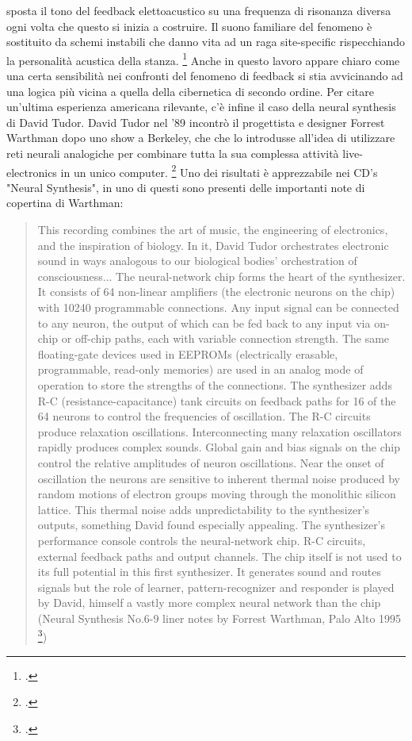 sposta il tono del feedback elettoacustico su una frequenza di risonanza
diversa ogni volta che questo si inizia a
costruire. Il suono familiare del fenomeno è sostituito da schemi instabili
che danno vita ad un raga site-specific
rispecchiando la personalità acustica della stanza. \footcite{collinspeasouphist}
Anche in questo lavoro appare chiaro come una certa sensibilità
nei confronti del fenomeno di feedback si stia avvicinando ad una logica più vicina
a quella della cibernetica di secondo ordine.
Per citare un'ultima esperienza americana rilevante,
c'è infine il caso della neural synthesis di David Tudor.
David Tudor nel '89 incontrò il progettista e designer Forrest Warthman
dopo uno show a Berkeley,
che che lo introdusse all'idea di utilizzare reti neurali analogiche
per combinare tutta la sua complessa attività live-electronics in un unico computer.
\footcite{tudorneuralsynth}
Uno dei risultati è apprezzabile nei CD's "Neural Synthesis", 
in uno di questi sono presenti delle importanti note di copertina di Warthman:

\begin{quote}
This recording combines the art of music, the engineering of electronics,
and the inspiration of biology. In it,
David Tudor orchestrates electronic sound in ways analogous to
our biological bodies' orchestration of consciousness...
The neural-network chip forms the heart of the synthesizer.
It consists of 64 non-linear amplifiers (the electronic neurons on the chip)
with 10240 programmable connections.
Any input signal can be connected to any neuron,
the output of which can be fed back to any input via on-chip or off-chip paths,
each with variable connection strength. The same floating-gate devices used in EEPROMs
(electrically erasable, programmable, read-only memories)
are used in an analog mode of operation to store the strengths of the connections.
The synthesizer adds R-C (resistance-capacitance) tank circuits on feedback
paths for 16 of the 64 neurons to control the frequencies of oscillation.
The R-C circuits produce relaxation oscillations.
Interconnecting many relaxation oscillators rapidly produces complex sounds.
Global gain and bias signals on the chip control the relative amplitudes of neuron oscillations.
Near the onset of oscillation the neurons are sensitive to inherent
thermal noise produced by random motions of electron groups moving through
the monolithic silicon lattice. This thermal noise adds unpredictability
to the synthesizer’s outputs, something David found especially appealing.
The synthesizer’s performance console controls the neural-network chip.
R-C circuits, external feedback paths and output channels.
The chip itself is not used to its full potential in this first synthesizer.
It generates sound and routes signals but the role of learner,
pattern-recognizer and responder is played by David, himself a vastly
more complex neural network than the chip \\
(Neural Synthesis No.6-9 liner notes by Forrest Warthman, Palo Alto 1995
\footcite{http://www.lovely.com/albumnotes/notes1602.html})
\end{quote}

